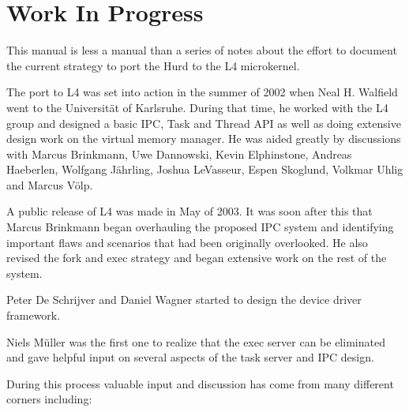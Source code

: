 \section{Work In Progress}

This manual is less a manual than a series of notes about the effort
to document the current strategy to port the Hurd to the L4
microkernel.

\begin{comment}
  Remarks about the history of a certain feature and implementation
  details are set in a smaller font and separated from the main text,
  just like this paragraph.  Because this is work in progress, there
  are naturally a lot of such comments.
\end{comment}

The port to L4 was set into action in the summer of 2002 when Neal
H. Walfield went to the Universit\"at of Karlsruhe.  During that time,
he worked with the L4 group and designed a basic IPC, Task and Thread
API as well as doing extensive design work on the virtual memory
manager.  He was aided greatly by discussions with Marcus Brinkmann,
Uwe Dannowski, Kevin Elphinstone, Andreas Haeberlen, Wolfgang
J\"ahrling, Joshua LeVasseur, Espen Skoglund, Volkmar Uhlig and Marcus
V\"olp.

A public release of L4 was made in May of 2003.  It was soon after
this that Marcus Brinkmann began overhauling the proposed IPC system
and identifying important flaws and scenarios that had been originally
overlooked.  He also revised the fork and exec strategy and began
extensive work on the rest of the system.

Peter De Schrijver and Daniel Wagner started to design the device
driver framework.

Niels M\"uller was the first one to realize that the exec server can
be eliminated and gave helpful input on several aspects of the task
server and IPC design.

During this process valuable input and discussion has come from many
different corners including: 


